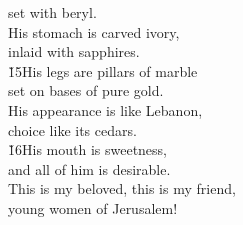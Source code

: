 \begin{poetry}
\poemll    set with beryl. \\
\poeml His stomach is carved ivory, \\
\poemll    inlaid with sapphires. \\
\poeml \v{15}His legs are pillars of marble \\
\poemll    set on bases of pure gold. \\
\poeml His appearance is like Lebanon, \\
\poemll    choice like its cedars. \\
\poeml \v{16}His mouth is sweetness, \\
\poemll    and all of him is desirable. \\
\poeml This is my beloved, this is my friend, \\
\poemll    young women of Jerusalem!
\end{poetry}


